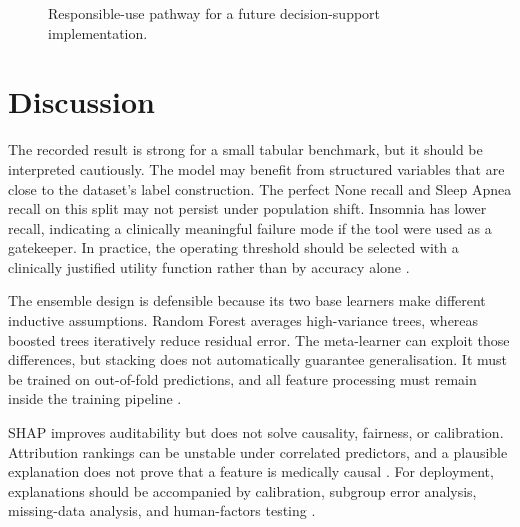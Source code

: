 ﻿\documentclass[preprint,12pt]{elsarticle}
\begin{document}
\begin{figure}[t]
\centering
{}
\caption{Responsible-use pathway for a future decision-support implementation.}
\label{fig:deployment}
\end{figure}

\section{Discussion}
The recorded result is strong for a small tabular benchmark, but it should be interpreted cautiously. The model may benefit from structured variables that are close to the dataset's label construction. The perfect None recall and Sleep Apnea recall on this split may not persist under population shift. Insomnia has lower recall, indicating a clinically meaningful failure mode if the tool were used as a gatekeeper. In practice, the operating threshold should be selected with a clinically justified utility function rather than by accuracy alone \cite{decisioncurve2021,steyerberg2024}.

The ensemble design is defensible because its two base learners make different inductive assumptions. Random Forest averages high-variance trees, whereas boosted trees iteratively reduce residual error. The meta-learner can exploit those differences, but stacking does not automatically guarantee generalisation. It must be trained on out-of-fold predictions, and all feature processing must remain inside the training pipeline \cite{stackreview2022,riley2021}.

SHAP improves auditability but does not solve causality, fairness, or calibration. Attribution rankings can be unstable under correlated predictors, and a plausible explanation does not prove that a feature is medically causal \cite{rudin2022,ar2023}. For deployment, explanations should be accompanied by calibration, subgroup error analysis, missing-data analysis, and human-factors testing \cite{who2021,kaur2022}.
\end{document}
